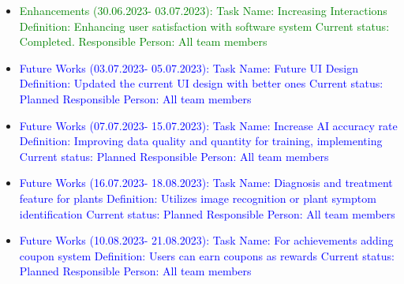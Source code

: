 \documentclass[conference]{IEEEtran}
\begin{document}
\begin{itemize}
   \item \textcolor{green} {Enhancements (30.06.2023- 03.07.2023):\newline\newline
  Task Name: Increasing Interactions \newline
  Definition: Enhancing user satisfaction with software system  \newline
  Current status: Completed.\newline 
  Responsible Person: All team members\newline
 }


    \item \textcolor{blue} {Future Works (03.07.2023- 05.07.2023):\newline\newline
  Task Name: Future UI Design \newline
  Definition: Updated the current UI design with better ones  \newline
  Current status: Planned \newline 
  Responsible Person: All team members\newline
 }

   \item \textcolor{blue} {Future Works (07.07.2023- 15.07.2023):\newline\newline
  Task Name: Increase AI accuracy rate \newline
  Definition: Improving data quality and quantity for training, implementing  \newline
  Current status: Planned \newline 
  Responsible Person: All team members\newline
 }

   \item \textcolor{blue} {Future Works (16.07.2023- 18.08.2023):\newline\newline
  Task Name: Diagnosis and treatment feature for plants \newline
  Definition: Utilizes image recognition or plant symptom identification \newline
  Current status: Planned \newline 
  Responsible Person: All team members\newline
 }

   \item \textcolor{blue} {Future Works (10.08.2023- 21.08.2023):\newline\newline
  Task Name: For achievements adding coupon system \newline
  Definition: Users can earn coupons as rewards  \newline
  Current status: Planned \newline 
  Responsible Person: All team members\newline
 }
 

\end{itemize}



\end{document}
